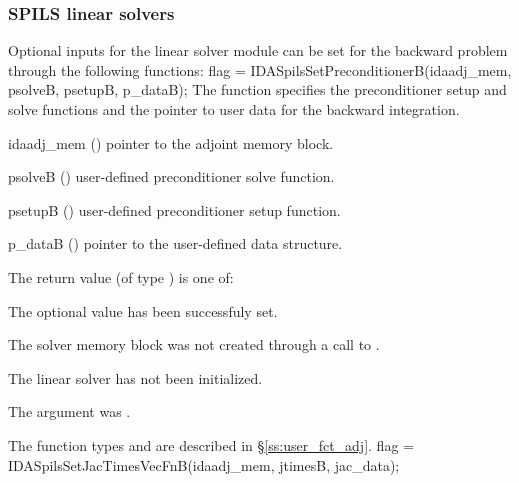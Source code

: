 \subsubsection{SPILS linear solvers}
Optional inputs for the {\idaspils} linear solver module can be set for the backward
problem through the following functions:
{
  flag = IDASpilsSetPreconditionerB(idaadj\_mem, psolveB, psetupB, p\_dataB);
}
{
  The function  specifies the preconditioner
  setup and solve functions and the pointer to user data for the backward integration.
}
{
  \begin{args}
  \item[idaadj\_mem] ()
    pointer to the adjoint memory block.
  \item[psolveB] ()
    user-defined preconditioner solve function.
  \item[psetupB] ()
    user-defined preconditioner setup function.
  \item[p\_dataB] ()
     pointer to the user-defined data structure.
  \end{args}
}
{
  The return value  (of type ) is one of:
  \begin{args}
  \item[\Id{IDASPILS\_SUCCESS}] 
    The optional value has been successfuly set.
  \item[\Id{IDASPILS\_MEM\_NULL}]
    The {\idas} solver memory block was not created through a call to .
  \item[\Id{IDASPILS\_LMEM\_NULL}]
    The {\idaspgmr} linear solver has not been initialized.
  \item[\Id{IDASPILS\_ADJMEM\_NULL}]
    The  argument was .
  \end{args}
}
{
   The function types  and  are
   described in \S\ref{ss:user_fct_adj}.
}
{
  flag = IDASpilsSetJacTimesVecFnB(idaadj\_mem, jtimesB, jac\_data);
}
